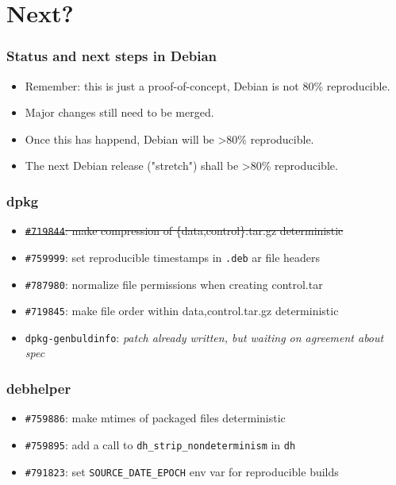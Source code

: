 \documentclass[14pt]{beamer}
\begin{document}
\section{Next?}

\begin{frame}
 \frametitle{Status and next steps in Debian}
 \begin{itemize}
  \item Remember: this is just a proof-of-concept, Debian is not 80\%
  reproducible.
  \item Major changes still need to be merged.
  \item Once this has happend, Debian will be >80\% reproducible.
  \item The next Debian release ("stretch") shall be >80\% reproducible.
 \end{itemize}
\end{frame}

\begin{frame}
 \frametitle{dpkg}

 \begin{itemize}\small
  \item \sout{\texttt{\#719844}: make compression of \{data,control\}.tar.gz deterministic}
  \item \texttt{\#759999}: set reproducible timestamps in \texttt{.deb} ar file headers
  \item \texttt{\#787980}: normalize file permissions when creating control.tar
  \item \texttt{\#719845}: make file order within {data,control}.tar.gz deterministic
  \item \texttt{dpkg-genbuldinfo}: \textit{patch already written, but waiting on agreement about spec}
 \end{itemize}
\end{frame}

\begin{frame}
 \frametitle{debhelper}

 \begin{itemize}\small
  \item \texttt{\#759886}: make mtimes of packaged files deterministic
  \item \texttt{\#759895}: add a call to \texttt{dh\_strip\_nondeterminism} in \texttt{dh}
  \item \texttt{\#791823}: set \texttt{SOURCE\_DATE\_EPOCH} env var for reproducible builds
 \end{itemize}
\end{frame}
\end{document}
